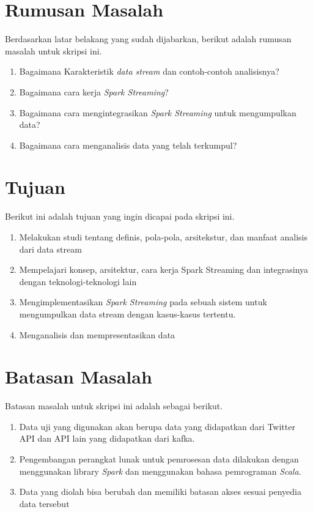 \section{Rumusan Masalah}
\label{sec:rumusan}
Berdasarkan latar belakang yang sudah dijabarkan, berikut adalah rumusan masalah untuk skripsi ini.
\begin{enumerate}
\item Bagaimana Karakteristik \textit{data stream} dan contoh-contoh analisisnya?
\item Bagaimana cara kerja \textit{Spark Streaming}?
\item Bagaimana cara mengintegrasikan \textit{Spark Streaming} untuk mengumpulkan data?
\item Bagaimana cara menganalisis data yang telah terkumpul?
\end{enumerate}

\section{Tujuan}
\label{sec:tujuan}
Berikut ini adalah tujuan yang ingin dicapai pada skripsi ini.
\begin{enumerate}
\item Melakukan studi tentang definis, pola-pola, arsitekstur, dan manfaat analisis dari data stream
\item Mempelajari konsep, arsitektur, cara kerja Spark Streaming dan integrasinya dengan teknologi-teknologi
lain
\item Mengimplementasikan \textit{Spark Streaming} pada sebuah sistem untuk mengumpulkan data stream dengan kasus-kasus tertentu.
\item Menganalisis dan mempresentasikan data 
\end{enumerate}

\section{Batasan Masalah}
Batasan masalah untuk skripsi ini adalah sebagai berikut.
\begin{enumerate}
	\item Data uji yang digunakan akan berupa data yang didapatkan dari Twitter  API dan API
	lain yang didapatkan dari kafka.
	\item Pengembangan perangkat lunak untuk pemrosesan data dilakukan dengan menggunakan 			library \textit{Spark} dan menggunakan bahasa pemrograman \textit{Scala}.
	\item Data yang diolah bisa berubah dan memiliki batasan akses sesuai penyedia data tersebut
\end{enumerate}
\label{sec:batasan}

